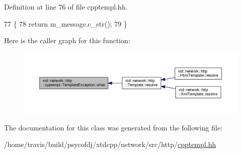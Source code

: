 Definition at line 76 of file cpptempl.\-hh.


\begin{DoxyCode}
77   \{
78     \textcolor{keywordflow}{return} m\_message.c\_str();
79   \}
\end{DoxyCode}


Here is the caller graph for this function\-:
\nopagebreak
\begin{figure}[H]
\begin{center}
\leavevmode
\includegraphics[width=350pt]{classxtd_1_1network_1_1http_1_1cpptempl_1_1TemplateException_ae7f1bb4b84c8689b502cdbaa0954ed41_icgraph}
\end{center}
\end{figure}




The documentation for this class was generated from the following file\-:\begin{DoxyCompactItemize}
\item 
/home/travis/build/psycofdj/xtdcpp/network/src/http/\hyperlink{cpptempl_8hh}{cpptempl.\-hh}\end{DoxyCompactItemize}
